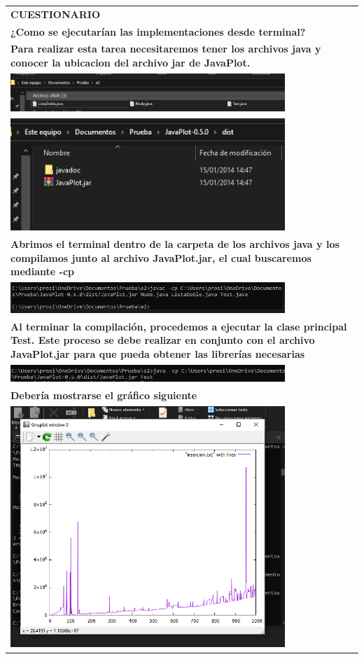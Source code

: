\documentclass[9pt]{article}
\begin{document}
\begin{longtable}{|p{15cm}|}
		\textbf{CUESTIONARIO}\\
		\textbf{¿Como se ejecutarían las implementaciones desde terminal?}\\
		\textbf{Para realizar esta tarea necesitaremos tener los archivos java y conocer la ubicacion del archivo jar de JavaPlot.}\\
		\includegraphics[width=0.8\textwidth,keepaspectratio]{img/java.png}\\
		\includegraphics[width=0.8\textwidth,keepaspectratio]{img/javaplot.png}\\
		\textbf{Abrimos el terminal dentro de la carpeta de los archivos java y los compilamos junto al archivo JavaPlot.jar, el cual buscaremos mediante -cp}\\
		\includegraphics[width=0.8\textwidth,keepaspectratio]{img/compilar.png}\\
		\textbf{Al terminar la compilación, procedemos a ejecutar la clase principal Test. Este proceso se debe realizar en conjunto con el archivo JavaPlot.jar para que pueda obtener las librerías necesarias}\\
		\includegraphics[width=0.8\textwidth,keepaspectratio]{img/ejecutamos.png}\\
		\textbf{Debería mostrarse el gráfico siguiente}\\
		\includegraphics[width=0.8\textwidth,keepaspectratio]{img/grafico1.png}\\

\end{longtable}
\end{document}
